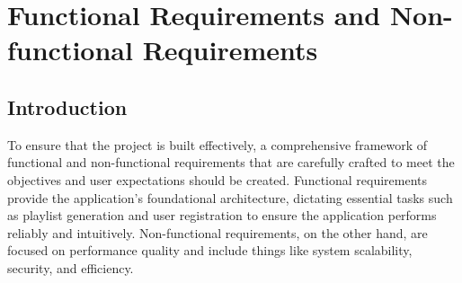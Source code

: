 \section{Functional Requirements and Non-functional Requirements}
\subsection{Introduction}
To ensure that the project is built effectively, a comprehensive framework of functional and non-functional requirements that are carefully crafted to meet the objectives and user expectations should be created.
Functional requirements provide the application's foundational architecture, dictating essential tasks such as playlist generation and user registration to ensure the application performs reliably and intuitively.
Non-functional requirements, on the other hand, are focused on performance quality and include things like system scalability, security, and efficiency.
